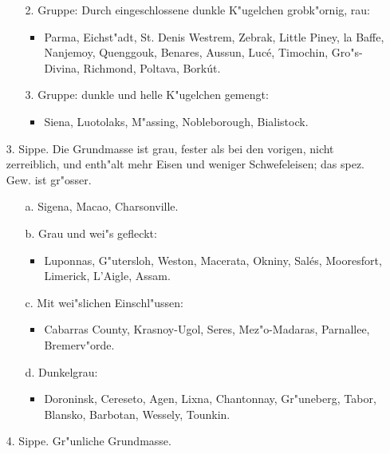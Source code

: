 \documentclass[a4paper, 11pt, oneside]{article}
\begin{document}
\begin{itemize}
\begin{itemize}
\begin{itemize}
\begin{itemize}
            \end{itemize}
        \end{itemize}
        \item[2.] Gruppe: Durch eingeschlossene dunkle K"ugelchen grobk"ornig, rau:
        \begin{itemize}
            \item Parma, Eichst"adt, St. Denis Westrem, Zebrak, Little Piney, la Baffe, Nanjemoy, Quenggouk, Benares, Aussun, Lucé, Timochin, Gro"s-Divina, Richmond, Poltava, Borkút.
        \end{itemize}
        \item[3.] Gruppe: dunkle und helle K"ugelchen gemengt:
        \begin{itemize}
            \item Siena, Luotolaks, M"assing, Nobleborough, Bialistock.
        \end{itemize}
    \end{itemize}
    \item[3. Sippe.] Die Grundmasse ist grau, fester als bei den vorigen, nicht zerreiblich, und enth"alt mehr Eisen und weniger Schwefeleisen; das spez. Gew. ist gr"osser.
    \begin{itemize}
        \item[a.] Sigena, Macao, Charsonville.
        \item[b.] Grau und wei"s gefleckt:
        \begin{itemize}
            \item Luponnas, G"utersloh, Weston, Macerata, Okniny, Salés, Mooresfort, Limerick, L'Aigle, Assam.
        \end{itemize}
        \item[c.] Mit wei"slichen Einschl"ussen:
        \begin{itemize}
            \item Cabarras County, Krasnoy-Ugol, Seres, Mez"o-Madaras, Parnallee, Bremerv"orde.
        \end{itemize}
        \item[d.] Dunkelgrau:
        \begin{itemize}
            \item Doroninsk, Cereseto, Agen, Lixna, Chantonnay, Gr"uneberg, Tabor, Blansko, Barbotan, Wessely, Tounkin.
        \end{itemize}
    \end{itemize}
    \item[4. Sippe.] Gr"unliche Grundmasse.
    \begin{itemize}

\end{itemize}
\end{itemize}
\end{document}
